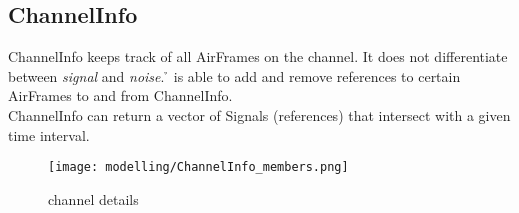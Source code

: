 



\subsection{ChannelInfo}

ChannelInfo keeps track of all AirFrames on the channel. It does not
differentiate between \textit{signal} and \textit{noise}. \h{\bp} is able to
add and remove references to certain AirFrames to and from ChannelInfo.\\
ChannelInfo can return a vector of Signals (references) that intersect with a
given time interval.

\begin{figure}[H]
 \centering
 \texttt{[image: modelling/ChannelInfo\_members.png]}
 \caption{channel details}
 \label{fig: channel details}
\end{figure}
